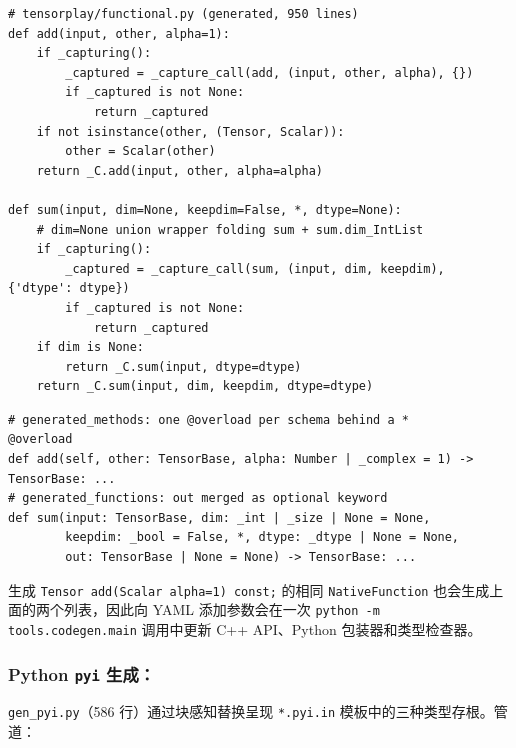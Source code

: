 \begin{lstlisting}[caption={and a stub signature (abridged).}, label=lst:functionalpyi, style=pystyle]
# tensorplay/functional.py (generated, 950 lines)
def add(input, other, alpha=1):
    if _capturing():
        _captured = _capture_call(add, (input, other, alpha), {})
        if _captured is not None:
            return _captured
    if not isinstance(other, (Tensor, Scalar)):
        other = Scalar(other)
    return _C.add(input, other, alpha=alpha)

def sum(input, dim=None, keepdim=False, *, dtype=None):
    # dim=None union wrapper folding sum + sum.dim_IntList
    if _capturing():
        _captured = _capture_call(sum, (input, dim, keepdim), {'dtype': dtype})
        if _captured is not None:
            return _captured
    if dim is None:
        return _C.sum(input, dtype=dtype)
    return _C.sum(input, dim, keepdim, dtype=dtype)
\end{lstlisting}

\begin{lstlisting}[caption={Stub rendering: \texttt{\_signature} and a generated \texttt{.pyi} line.}, label=lst:pyisig, style=pystyle]
# generated_methods: one @overload per schema behind a *
@overload
def add(self, other: TensorBase, alpha: Number | _complex = 1) -> TensorBase: ...
# generated_functions: out merged as optional keyword
def sum(input: TensorBase, dim: _int | _size | None = None,
        keepdim: _bool = False, *, dtype: _dtype | None = None,
        out: TensorBase | None = None) -> TensorBase: ...
\end{lstlisting}

生成 \texttt{Tensor add(Scalar alpha=1) const;} 的相同 \texttt{NativeFunction} 也会生成上面的两个列表，因此向 YAML 添加参数会在一次 \texttt{python -m tools.codegen.main} 调用中更新 C++ API、Python 包装器和类型检查器。

\subsubsection{Python \texttt{pyi} 生成：}

\texttt{gen\_pyi.py}（586 行）通过块感知替换呈现 \texttt{*.pyi.in} 模板中的三种类型存根。管道：

